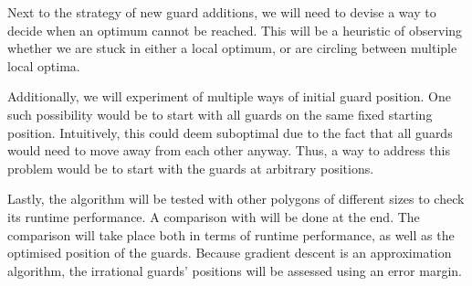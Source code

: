 Next to the strategy of new guard additions, we will need to devise a way to decide when an optimum cannot be reached. This will be a heuristic of observing whether we are stuck in either a local optimum, or are circling between multiple local optima.

Additionally, we will experiment of multiple ways of initial guard position. One such possibility would be to start with all guards on the same fixed starting position. Intuitively, this could deem suboptimal due to the fact that all guards would need to move away from each other anyway. Thus, a way to address this problem would be to start with the guards at arbitrary positions.

Lastly, the algorithm will be tested with other polygons of different sizes to check its runtime performance. A comparison with \cite{DBLP:journals/corr/abs-2007-06920} will be done at the end. The comparison will take place both in terms of runtime performance, as well as the optimised position of the guards. Because gradient descent is an approximation algorithm, the irrational guards' positions will be assessed using an error margin.

